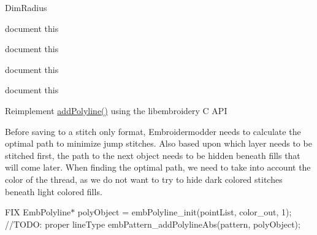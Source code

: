 \begin{DoxyRefList}
Dim\+Radius  
\item[Member \mbox{\hyperlink{classPropertyEditor_af77a9b50a881ba48136c67f40c274e1e}{Property\+Editor\+::create\+Combo\+Box\+Selected}} ()]\label{todo__todo000018}%
%
document this  
\item[Member \mbox{\hyperlink{classPropertyEditor_a25880d96f0b4466fc4342255adaa7022}{Property\+Editor\+::create\+Tool\+Button\+QSelect}} ()]\label{todo__todo000019}%
%
document this  
\item[Member \mbox{\hyperlink{classPropertyEditor_ad7452c5931d2f0c7f63a308d1ccccfc7}{Property\+Editor\+::event\+Filter}} (QObject $\ast$obj, QEvent $\ast$event)]\label{todo__todo000017}%
%
document this  
\item[Member \mbox{\hyperlink{classPropertyEditor_a4bca2abc45a97402b7135f7b8407d125}{Property\+Editor\+::$\sim$\+Property\+Editor}} ()]\label{todo__todo000016}%
%
document this  
\item[Member \mbox{\hyperlink{classSaveObject_ae11f893d999e959825a7ee160b269e51}{Save\+Object\+::add\+Path}} (Emb\+Pattern $\ast$pattern, QGraphics\+Item $\ast$item)]\label{todo__todo000014}%
%
Reimplement \mbox{\hyperlink{classSaveObject_ace37a0a25fcffac8075e6814ed54255a}{add\+Polyline()}} using the libembroidery C API  
\item[Member \mbox{\hyperlink{classSaveObject_a450a41fe8347cc65b1c72caeeab38e67}{Save\+Object\+::save}} (QString file\+Name)]\label{todo__todo000013}%
%
Before saving to a stitch only format, Embroidermodder needs to calculate the optimal path to minimize jump stitches. Also based upon which layer needs to be stitched first, the path to the next object needs to be hidden beneath fills that will come later. When finding the optimal path, we need to take into account the color of the thread, as we do not want to try to hide dark colored stitches beneath light colored fills.  
\item[Member \mbox{\hyperlink{classSaveObject_a0d041d54c0440f2ea8393c67df3c25a9}{Save\+Object\+::to\+Polyline}} (Emb\+Pattern $\ast$pattern, const QPointF \&obj\+Pos, const QPainter\+Path \&obj\+Path, QString layer, const QColor \&color, QString line\+Type, QString line\+Weight)]\label{todo__todo000015}%
%
FIX Emb\+Polyline$\ast$ poly\+Object = emb\+Polyline\+\_\+init(point\+List, color\+\_\+out, 1); //\+TODO\+: proper line\+Type emb\+Pattern\+\_\+add\+Polyline\+Abs(pattern, poly\+Object);  

\end{DoxyRefList}
